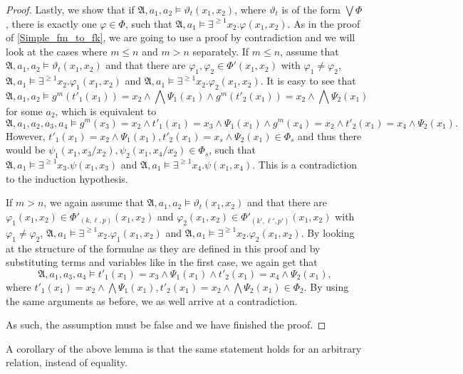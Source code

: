 \documentclass[a4paper,11pt,DIV=15]{scrartcl} %
\renewcommand{\phi}{\varphi}
\theoremstyle{plain}
\theoremstyle{definition}
\renewcommand{\theta}{\vartheta}
\begin{document}
\begin{proof}
	Lastly, we show that if $\mathfrak A,a_1,a_2\models \theta_t(x_1,x_2)$, where $\theta_t$ is of the form $\bigvee \Phi$, there is exactly one $\phi\in\Phi$, such that $\mathfrak A,a_1\models \exists^{\geq 1} x_2.\phi(x_1,x_2)$.
	As in the proof of \cref{Simple_fm_to_fk}, we are going to use a proof by contradiction and we will look at the cases where $m\leq n$ and $m> n$ separately.
	If $m\leq n$, assume that $\mathfrak A,a_1,a_2\models \theta_t(x_1,x_2)$ and that there are $\phi_1,\phi_2\in \Phi'(x_1,x_2)$ with $\phi_1\neq \phi_2$, $\mathfrak A,a_1\models \exists^{\geq 1}x_2.\phi_1(x_1,x_2)$ and $\mathfrak A,a_1\models \exists^{\geq 1}x_2.\phi_2(x_1,x_2)$.
	It is easy to see that 
	$$\mathfrak A,a_1,a_2\models g^m(t'_1(x_1))=x_2 \land \bigwedge \Psi_1(x_1) \land g^m(t'_2(x_1))=x_2 \land \bigwedge\Psi_2(x_1)$$
	for some $a_2$, which is equivalent to
	$$\mathfrak A,a_1,a_2,a_3,a_4\models g^m(x_3)=x_2 \land t'_1(x_1)=x_3\land \Psi_1(x_1) \land g^m(x_4)=x_2 \land t'_2(x_1)=x_4 \land \Psi_2(x_1).$$
	However, $t'_1(x_1)=x_2\land \Psi_1(x_1), t'_2(x_1)=x_s \land \Psi_2(x_1) \in \Phi_s$ and thus there would be $\psi_1(x_1,x_3/x_2),\psi_2(x_1,x_4/x_2) \in \Phi_s$, such that $\mathfrak A,a_1\models \exists^{\geq 1}x_3. \psi(x_1,x_3)$ and $\mathfrak A,a_1\models \exists^{\geq 1}x_4.\psi(x_1,x_4)$.
	This is a contradiction to the induction hypothesis.
	
	If $m>n$, we again assume that $\mathfrak A,a_1,a_2\models \theta_t(x_1,x_2)$ and that there are $\phi_1(x_1,x_2)\in\Phi'_{(k,\ell,p)}(x_1,x_2)$ and $\phi_2(x_1,x_2)\in\Phi'_{(k',\ell',p')}(x_1,x_2)$ with $\phi_1\neq \phi_2$, $\mathfrak A,a_1\models \exists^{\geq 1}x_2.\phi_1(x_1,x_2)$ and $\mathfrak A,a_1\models \exists^{\geq 1}x_2.\phi_2(x_1,x_2)$.
	By looking at the structure of the formulae as they are defined in this proof and by substituting terms and variables like in the first case, we again get that 
	$$\mathfrak A,a_1,a_3,a_4\models t'_1(x_1)=x_3\land \Psi_1(x_1) \land t'_2(x_1)=x_4 \land \Psi_2(x_1),$$
	where $t'_1(x_1)=x_2\land\bigwedge \Psi_1(x_1), t'_2(x_1)=x_2\land\bigwedge \Psi_2(x_1)\in \Phi_2$.
	By using the same arguments as before, we as well arrive at a contradiction.
	
	As such, the assumption must be false and we have finished the proof.
\end{proof}

A corollary of the above lemma is that the same statement holds for an arbitrary relation, instead of equality.
\end{document}
